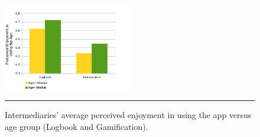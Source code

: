 \begin{figure}[htbp]
  \centering
    \includegraphics[width=0.5\textwidth]{Figures/PE_Interm_App_exp_seq.png}
    \rule{35em}{0.5pt}
  \caption{Intermediaries' average perceived enjoyment in using the app versus age group (Logbook and Gamification).}
  \label{figure:PE_Interm_App_exp_seq}
\end{figure}\newline

